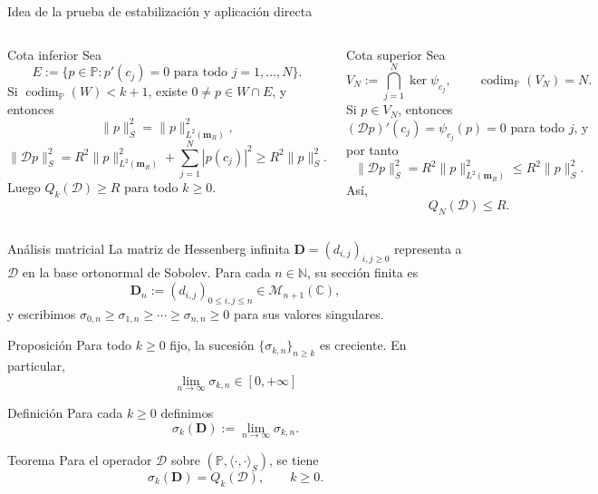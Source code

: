 \documentclass[aspectratio=169,10pt]{beamer}
\newcommand{\C}{\mathbb{C}}
\newcommand{\Poly}{\mathbb{P}}
\newcommand{\D}{\mathcal{D}}
\newcommand{\mR}{\mathbf{m}_R}
\newcommand{\codim}{\operatorname{codim}}
\begin{document}
\begin{frame}{Idea de la prueba de estabilización y aplicación directa}
  \footnotesize
  \setlength{\abovedisplayskip}{2pt}
  \setlength{\belowdisplayskip}{2pt}
  \setlength{\abovedisplayshortskip}{1pt}
  \setlength{\belowdisplayshortskip}{1pt}
  \begin{columns}[T,onlytextwidth]
    \begin{block}{Cota inferior}
      Sea
      \[
        E:=\{p\in\Poly:p'(c_j)=0\text{ para todo }j=1,\dots,N\}.
      \]
      Si \(\codim_{\Poly}(W)<k+1\), existe \(0\neq p\in W\cap E\), y entonces
      \[
        \|p\|_S^2=\|p\|_{L^2(\mR)}^2,
      \]
      \[
        \|\D p\|_S^2
        =R^2\|p\|_{L^2(\mR)}^2+\sum_{j=1}^N |p(c_j)|^2
        \ge R^2\|p\|_S^2.
      \]
      Luego \(Q_k(\D)\ge R\) para todo \(k\ge0\).
    \end{block}

    \begin{block}{Cota superior}
      Sea
      \[
        V_N:=\bigcap_{j=1}^N\ker\psi_{c_j},
        \qquad
        \codim_{\Poly}(V_N)=N.
      \]
      Si \(p\in V_N\), entonces \((\D p)'(c_j)=\psi_{c_j}(p)=0\) para todo \(j\), y por tanto
      \[
        \|\D p\|_S^2=R^2\|p\|_{L^2(\mR)}^2\le R^2\|p\|_S^2.
      \]
      Así,
      \[
        Q_N(\D)\le R.
      \]
    \end{block}
  \end{columns}
\end{frame}

\begin{frame}{Análisis matricial}
  \scriptsize
  \setlength{\abovedisplayskip}{3pt}
  \setlength{\belowdisplayskip}{3pt}
  \setlength{\abovedisplayshortskip}{2pt}
  \setlength{\belowdisplayshortskip}{2pt}
  La matriz de Hessenberg infinita \(\mathbf D=(d_{i,j})_{i,j\ge0}\) representa a \(\D\) en la base ortonormal de Sobolev. Para cada \(n\in\mathbb N\), su sección finita es
  \[
    \mathbf D_n:=(d_{i,j})_{0\le i,j\le n}\in\mathcal M_{n+1}(\C),
  \]
  y escribimos \(\sigma_{0,n}\ge\sigma_{1,n}\ge\cdots\ge\sigma_{n,n}\ge0\) para sus valores singulares.

  \begin{block}{Proposición}
    Para todo \(k\ge0\) fijo, la sucesión \(\{\sigma_{k,n}\}_{n\ge k}\) es creciente. En particular,
    \[
      \lim_{n\to\infty}\sigma_{k,n}\in[0,+\infty]
    \]
  \end{block}

  \begin{block}{Definición}
    Para cada \(k\ge0\) definimos
    \[
      \sigma_k(\mathbf D):=\lim_{n\to\infty}\sigma_{k,n}.
    \]
  \end{block}

  \begin{block}{Teorema}
    Para el operador \(\D\) sobre \((\Poly,\langle\cdot,\cdot\rangle_S)\), se tiene
    \[
      \sigma_k(\mathbf D)=Q_k(\D),\qquad k\ge0.
    \]
  \end{block}
\end{frame}
\end{document}
